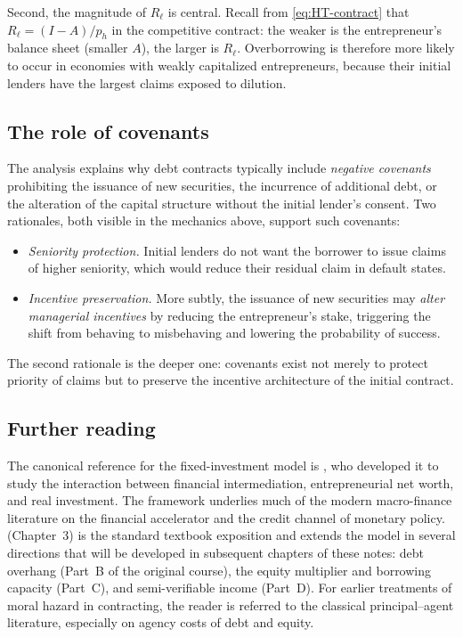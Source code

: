 \documentclass[11pt,a4paper,oneside]{book}
\theoremstyle{plain}
\theoremstyle{definition}
\theoremstyle{remark}
\numberwithin{equation}{chapter}
\begin{document}
Second, the magnitude of $R_\ell$ is central.
Recall from \eqref{eq:HT-contract} that $R_\ell = (I - A)/p_h$ in the competitive contract: the weaker is the entrepreneur's balance sheet (smaller $A$), the larger is $R_\ell$.
Overborrowing is therefore more likely to occur in economies with weakly capitalized entrepreneurs, because their initial lenders have the largest claims exposed to dilution.

\subsection{The role of covenants}

The analysis explains why debt contracts typically include \emph{negative covenants} prohibiting the issuance of new securities, the incurrence of additional debt, or the alteration of the capital structure without the initial lender's consent.
Two rationales, both visible in the mechanics above, support such covenants:
\begin{itemize}
  \item \emph{Seniority protection.}
  Initial lenders do not want the borrower to issue claims of higher seniority, which would reduce their residual claim in default states.
  \item \emph{Incentive preservation.}
  More subtly, the issuance of new securities may \emph{alter managerial incentives} by reducing the entrepreneur's stake, triggering the shift from behaving to misbehaving and lowering the probability of success.
\end{itemize}
The second rationale is the deeper one: covenants exist not merely to protect priority of claims but to preserve the incentive architecture of the initial contract.

\subsection{Further reading}

The canonical reference for the fixed-investment model is \citet{HolmstromTirole1997}, who developed it to study the interaction between financial intermediation, entrepreneurial net worth, and real investment.
The framework underlies much of the modern macro-finance literature on the financial accelerator and the credit channel of monetary policy.
\citet{Tirole2006} (Chapter~3) is the standard textbook exposition and extends the model in several directions that will be developed in subsequent chapters of these notes: debt overhang (Part~B of the original course), the equity multiplier and borrowing capacity (Part~C), and semi-verifiable income (Part~D).
For earlier treatments of moral hazard in contracting, the reader is referred to the classical principal--agent literature, especially \citet{JensenMeckling1976} on agency costs of debt and equity.
\end{document}
